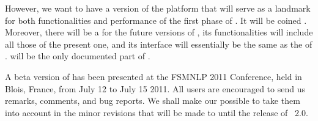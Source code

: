 % 
% 



However, we want to have a version of the platform that will serve as 
a landmark for both functionalities and  
performance of the first phase of \vcsn.
It will be coined \vcsnv.
Moreover, there will be a \tafkit for the future versions of \vcsn,
its  functionalities will include all those of the present one,
and its interface will essentially be the same as the \tafkit of 
\vcsnv.
\tafkitv will be the only documented part of \vcsnv.

A beta version of \vcsnv has been presented at the FSMNLP 2011 Conference, 
held in Blois, France, from July 12 to July 15 2011.
All users are encouraged to send us remarks, comments, and bug reports.
We shall make our possible to take them into account in the minor 
revisions that will be made to \vcsnv until the release of \vcsn~2.0.

\endinput 


